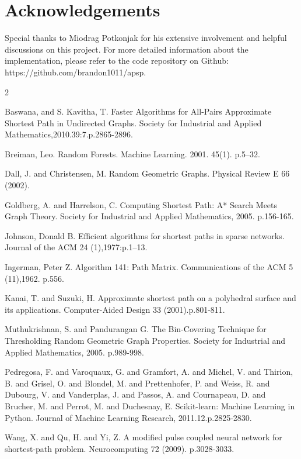\documentclass[10.5pt,journal]{IEEEtran}
\begin{document}
\section{Acknowledgements}
	Special thanks to Miodrag Potkonjak for his extensive involvement and helpful discussions
	on this project. For more detailed information about the implementation, please
	refer to the code repository on Github: https://github.com/brandon1011/apsp. 
	\begin{thebibliography} {2} \normalsize
	
		  Baswana, and S. Kavitha, T.
         Faster Algorithms for All-Pairs Approximate Shortest Path in Undirected Graphs.
         Society for Industrial and Applied Mathematics,2010.39:7.p.2865-2896.
         
         Breiman, Leo. Random Forests. Machine Learning. 2001. 45(1). p.5–32.
         
		 Dall, J. and Christensen, M.
		Random Geometric Graphs.
		Physical Review E 66 (2002).
	
		 Goldberg, A. and Harrelson, C.
		Computing Shortest Path: A* Search Meets Graph Theory.
		Society for Industrial and Applied Mathematics, 2005.
		p.156-165.
		
		Johnson, Donald B.
		Efficient algorithms for shortest paths in sparse networks.
		Journal of the ACM 24 (1),1977:p.1–13.
		
		Ingerman, Peter Z.
		Algorithm 141: Path Matrix. 
		Communications of the ACM 5 (11),1962.
		p.556.

		 Kanai, T. and Suzuki, H.
		Approximate shortest path on a polyhedral surface and its applications.
		Computer-Aided Design 33 (2001).p.801-811.
		
		 Muthukrishnan, S. and Pandurangan G.
		The Bin-Covering Technique for Thresholding Random Geometric Graph Properties.
		Society for Industrial and Applied Mathematics, 2005.
		p.989-998.
		 
		 Pedregosa, F. and Varoquaux, G. and Gramfort, A. and Michel, V.
         and Thirion, B. and Grisel, O. and Blondel, M. and Prettenhofer, P.
         and Weiss, R. and Dubourg, V. and Vanderplas, J. and Passos, A. and
         Cournapeau, D. and Brucher, M. and Perrot, M. and Duchesnay, E.
         Scikit-learn: Machine Learning in Python.
         Journal of Machine Learning Research, 2011.12.p.2825-2830.
         
          Wang, X. and Qu, H. and Yi, Z.
         A modified pulse coupled neural network for shortest-path problem.
         Neurocomputing 72 (2009).
         p.3028-3033.
         

	\end{thebibliography}
\end{document}
